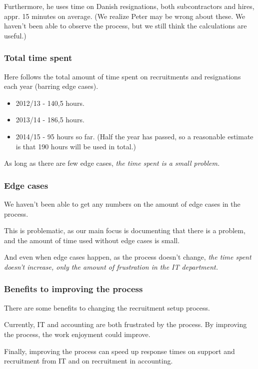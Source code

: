 Furthermore, he uses time on Danish resignations, both subcontractors and hires, appr. 15 minutes on average.
(We realize Peter may be wrong about these. We haven't been able to observe the process, but we still think the calculations are useful.)


\subsubsection{Total time spent}
Here follows the total amount of time spent on recruitments and resignations each year (barring edge cases).
\begin{itemize}
\item 2012/13 - 140,5 hours.
\item 2013/14 - 186,5 hours.
\item 2014/15 - 95 hours so far. (Half the year has passed, so a reasonable estimate is that 190 hours will be used in total.)
\end{itemize}

As long as there are few edge cases, \emph{the time spent is a small problem.}

\subsubsection{Edge cases}
We haven't been able to get any numbers on the amount of edge cases in the process.

This is problematic, as our main focus is documenting that there is a problem, and the amount of time used without edge cases is small.

And even when edge cases happen, as the process doesn't change, \emph{the time spent doesn't increase, only the amount of frustration in the IT department.}

\subsubsection{Benefits to improving the process}
There are some benefits to changing the recruitment setup process.

Currently, IT and accounting are both frustrated by the process.
By improving the process, the work enjoyment could improve.

Finally, improving the process can speed up response times on support and recruitment from IT and on recruitment in accounting.

